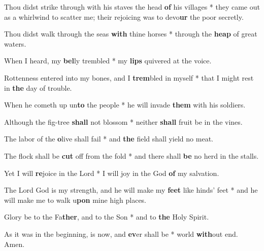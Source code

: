 \begin{multicols}{2}
	Thou didst strike through with his staves the head \textbf{of} his villages * they came out as a whirlwind to scatter me; their rejoicing was to devo\textbf{ur} the poor secretly.
	
	Thou didst walk through the seas \textbf{with} thine horses * through the \textbf{heap} of great waters.
	
	When I heard, my \textbf{bel}ly trembled * my \textbf{lips} quivered at the voice.
	
	Rottenness entered into my bones, and I \textbf{trem}bled in myself * that I might rest in \textbf{the} day of trouble.
	
	When he cometh up un\textbf{to} the people * he will invade \textbf{them} with his soldiers.
	
	Although the fig-tree \textbf{shall} not blossom * neither \textbf{shall} fruit be in the vines.
	
	The labor of the \textbf{o}live shall fail * and \textbf{the} field shall yield no meat.
	
	The flock shall be \textbf{cut} off from the fold * and there shall \textbf{be} no herd in the stalls.
	
	Yet I will \textbf{re}joice in the Lord * I will joy in the God \textbf{of} my salvation.
	
	The Lord God is my strength, and he will make my \textbf{feet} like hinds' feet * and he will make me to walk u\textbf{pon} mine high places.
	
	Glory be to the Fa\textbf{ther}, and to the Son * and to \textbf{the} Holy Spirit.
	
	As it was in the beginning, is now, and \textbf{ev}er shall be * world \textbf{with}out end. Amen.
\end{multicols}
